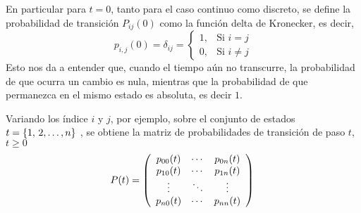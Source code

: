 \begin{Obs}
    En particular para $t= 0$, tanto para el caso continuo como discreto, se define la probabilidad de transición $P_{i j}(0)$ como la función delta de Kronecker, es decir,
    $$p_{i,j}(0)=\delta_{i j}=\begin{cases}
        1, & \mbox{Si $i=j$}\\
        0, & \mbox{Si $i\not= j$}
    \end{cases}$$
    Esto nos da a entender que, cuando el tiempo aún no transcurre, la probabilidad de que ocurra un cambio es nula, mientras que la probabilidad de que permanezca en el mismo estado es absoluta, es decir $1$.
\end{Obs}
Variando los índice $i$ y $j$, por ejemplo, sobre el conjunto de estados $t=\{ 1,\thinspace 2,\ldots, n\}$ , se
obtiene la matriz de probabilidades de transición de paso $t$, $t\geq 0$
$$P(t)=\left( \begin{array}{ccc}
p_{0 0}(t) & \cdots & p_{0 n}(t) \\ 
p_{1 0}(t) & \cdots & p_{1 n}(t)\\
\vdots & \ddots & \vdots \\
p_{n 0}(t) & \cdots & p_{n n}(t) 
\end{array}\right)\\$$
